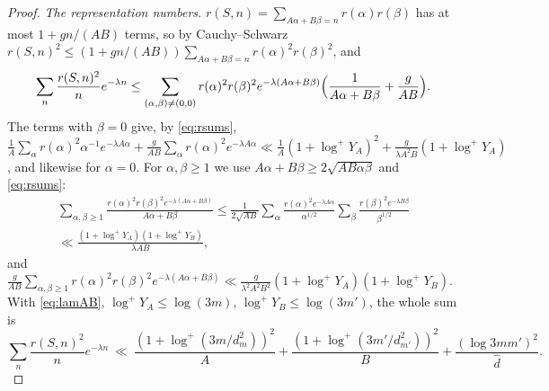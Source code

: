 ﻿\documentclass[11pt]{amsart}
\theoremstyle{remark}
\newcommand{\rk}{r}
\begin{document}
\begin{proof}
\emph{The representation numbers.} $\rk(S,n)=\sum_{A\alpha+B\beta=n}r(\alpha)r(\beta)$ has at most $1+gn/(AB)$ terms, so by Cauchy--Schwarz $\rk(S,n)^2\le(1+gn/(AB))\sum_{A\alpha+B\beta=n}r(\alpha)^2r(\beta)^2$, and
\[
\sum_n\frac{\rk(S,n)^2}n e^{-\lambda n}\le\sum_{(\alpha,\beta)\ne(0,0)}r(\alpha)^2r(\beta)^2e^{-\lambda(A\alpha+B\beta)}\Bigl(\frac1{A\alpha+B\beta}+\frac g{AB}\Bigr).
\]
The terms with $\beta=0$ give, by \eqref{eq:rsums}, $\frac1A\sum_\alpha r(\alpha)^2\alpha^{-1}e^{-\lambda A\alpha}+\frac g{AB}\sum_\alpha r(\alpha)^2e^{-\lambda A\alpha}\ll\frac1A(1+\log^+Y_A)^2+\frac{g}{\lambda A^2B}(1+\log^+Y_A)$, and likewise for $\alpha=0$. For $\alpha,\beta\ge1$ we use $A\alpha+B\beta\ge2\sqrt{AB\alpha\beta}$ and \eqref{eq:rsums}:
\begin{multline*}
\sum_{\alpha,\beta\ge1}\frac{r(\alpha)^2r(\beta)^2e^{-\lambda(A\alpha+B\beta)}}{A\alpha+B\beta}\le\frac1{2\sqrt{AB}}\sum_\alpha\frac{r(\alpha)^2e^{-\lambda A\alpha}}{\alpha^{1/2}}\sum_\beta\frac{r(\beta)^2e^{-\lambda B\beta}}{\beta^{1/2}}\\
\ll\frac{(1+\log^+Y_A)(1+\log^+Y_B)}{\lambda AB},
\end{multline*}
and $\frac g{AB}\sum_{\alpha,\beta\ge1}r(\alpha)^2r(\beta)^2e^{-\lambda(A\alpha+B\beta)}\ll\frac{g}{\lambda^2A^2B^2}(1+\log^+Y_A)(1+\log^+Y_B)$. With \eqref{eq:lamAB}, $\log^+Y_A\le\log(3m)$, $\log^+Y_B\le\log(3m')$, the whole sum is
\begin{equation}\label{eq:repbound}
\sum_n\frac{\rk(S,n)^2}n e^{-\lambda n}\ \ll\ \frac{(1+\log^+(3m/d_m^2))^2}{A}+\frac{(1+\log^+(3m'/d_{m'}^2))^2}{B}+\frac{(\log3mm')^2}{\hat d}.
\end{equation}


\end{proof}
\end{document}
